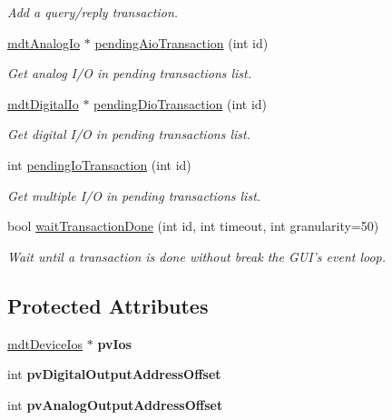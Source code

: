 \begin{DoxyCompactItemize}
\begin{DoxyCompactList}\small\item\em Add a query/reply transaction. \end{DoxyCompactList}\item 
\hyperlink{classmdt_analog_io}{mdtAnalogIo} $\ast$ \hyperlink{classmdt_device_a3c363d61bf4019dbb40a15ac28fd51af}{pendingAioTransaction} (int id)
\begin{DoxyCompactList}\small\item\em Get analog I/O in pending transactions list. \end{DoxyCompactList}\item 
\hyperlink{classmdt_digital_io}{mdtDigitalIo} $\ast$ \hyperlink{classmdt_device_aa7d3959fc291e3e2ae8d712656595dcc}{pendingDioTransaction} (int id)
\begin{DoxyCompactList}\small\item\em Get digital I/O in pending transactions list. \end{DoxyCompactList}\item 
int \hyperlink{classmdt_device_a789ded0f30663dde43ca5d4067273eb7}{pendingIoTransaction} (int id)
\begin{DoxyCompactList}\small\item\em Get multiple I/O in pending transactions list. \end{DoxyCompactList}\item 
bool \hyperlink{classmdt_device_a1df875803a3a0eb7324047d33c139621}{waitTransactionDone} (int id, int timeout, int granularity=50)
\begin{DoxyCompactList}\small\item\em Wait until a transaction is done without break the GUI's event loop. \end{DoxyCompactList}\end{DoxyCompactItemize}
\subsection*{Protected Attributes}
\begin{DoxyCompactItemize}
\item 
\hypertarget{classmdt_device_aa84e01b13f98fc35476a2654f1c8d2b3}{
\hyperlink{classmdt_device_ios}{mdtDeviceIos} $\ast$ {\bfseries pvIos}}
\label{classmdt_device_aa84e01b13f98fc35476a2654f1c8d2b3}

\item 
\hypertarget{classmdt_device_a7578dfa3df390d20b1bdce1319d45dbc}{
int {\bfseries pvDigitalOutputAddressOffset}}
\label{classmdt_device_a7578dfa3df390d20b1bdce1319d45dbc}

\item 
\hypertarget{classmdt_device_a50a6824fe8b9ae2a7e7c56b8e0686a76}{
int {\bfseries pvAnalogOutputAddressOffset}}
\label{classmdt_device_a50a6824fe8b9ae2a7e7c56b8e0686a76}

\end{DoxyCompactItemize}


